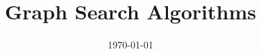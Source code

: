 \documentclass{beamer}
\title[Search]{Graph Search Algorithms} %
\institute[BYU] %
{
Brigham Young University \\ %
\medskip
}
\date{\today} %
\begin{document}
\begin{frame}
\titlepage %
\end{frame}






\end{document}
